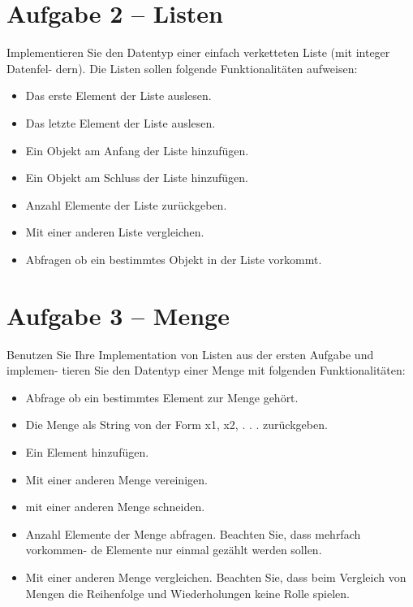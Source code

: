 \section*{Aufgabe 2 – Listen}
Implementieren Sie den Datentyp einer einfach verketteten Liste (mit integer Datenfel- dern). Die Listen sollen folgende Funktionalitäten aufweisen:\\

\begin{itemize}
	\item
		Das erste Element der Liste auslesen.
	\item
		Das letzte Element der Liste auslesen.
	\item
		Ein Objekt am Anfang der Liste hinzufügen.
	\item
		Ein Objekt am Schluss der Liste hinzufügen.
	\item
		Anzahl Elemente der Liste zurückgeben.
	\item
		Mit einer anderen Liste vergleichen.
	\item
		Abfragen ob ein bestimmtes Objekt in der Liste vorkommt.
\end{itemize}

% 

\newpage

\section*{Aufgabe 3 – Menge}
Benutzen Sie Ihre Implementation von Listen aus der ersten Aufgabe und implemen- tieren Sie den Datentyp einer Menge mit folgenden Funktionalitäten:

\begin{itemize}
	\item
		Abfrage ob ein bestimmtes Element zur Menge gehört.
	\item
		Die Menge als String von der Form {x1, x2, . . . } zurückgeben.
	\item
		Ein Element hinzufügen.
	\item
		Mit einer anderen Menge vereinigen.
	\item
		mit einer anderen Menge schneiden.
	\item
		Anzahl Elemente der Menge abfragen. Beachten Sie, dass mehrfach vorkommen- de Elemente nur einmal gezählt werden sollen.
	\item
		Mit einer anderen Menge vergleichen. Beachten Sie, dass beim Vergleich von Mengen die Reihenfolge und Wiederholungen keine Rolle spielen.
		
\end{itemize}

% 
